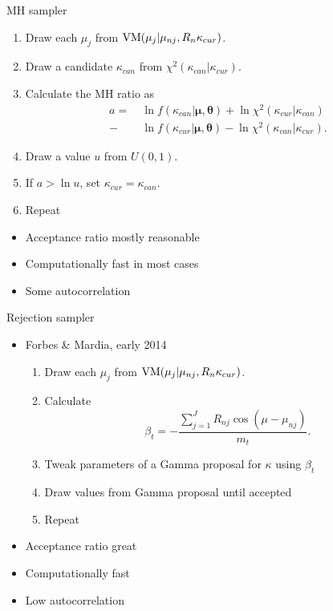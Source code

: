 \documentclass{beamer}
\begin{document}
\begin{frame}{MH sampler}



\begin{enumerate}
\item Draw each $\mu_{j}$ from $\textnormal{VM}(\mu_{j} \vert \mu_{nj}, R_n\kappa_{cur})$. \label{beginmhloop}
\item Draw a candidate $\kappa_{can}$ from $\chi^2(\kappa_{can} \vert \kappa_{cur})$. 
\item Calculate the MH ratio as 
\begin{align*}
a = ~& \ln f(\kappa_{can} \vert \boldsymbol{\mu}, \boldsymbol\theta) + \ln  \chi^2(\kappa_{cur} \vert \kappa_{can}) \\
   - & \ln f(\kappa_{cur} \vert \boldsymbol{\mu}, \boldsymbol\theta) - \ln \chi^2(\kappa_{can} \vert \kappa_{cur}).
\end{align*}

\item Draw a value $u$ from $U(0,1)$. 
\item If $a > \ln u $, set $\kappa_{cur} = \kappa_{can}$. \label{endmhloop}
\item Repeat
\end{enumerate}


\begin{itemize}
\item Acceptance ratio mostly reasonable 
\item Computationally fast in most cases
\item Some autocorrelation 
\end{itemize}

\end{frame}

\begin{frame}{Rejection sampler}
\begin{itemize}
\item Forbes \& Mardia, early 2014 

\begin{enumerate}
\item Draw each $\mu_{j}$ from $\textnormal{VM}(\mu_{j} \vert \mu_{nj}, R_n\kappa_{cur})$.
\item Calculate $$\beta_t = -  \frac{\sum_{j=1}^{J} R_{nj} \cos (\mu - \mu_{nj})}{m_t}.$$
\item Tweak parameters of a Gamma proposal for $\kappa$ using $\beta_t$
\item Draw values from Gamma proposal until accepted
\item Repeat
\end{enumerate}
\item Acceptance ratio great 
\item Computationally fast
\item Low autocorrelation 
\end{itemize}
\end{frame}
\end{document}
